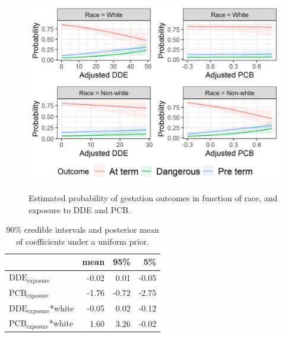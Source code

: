 \documentclass[10pt]{jmlr}%
\begin{document}
\begin{figure}[htbp]
	\centering
	\caption{Estimated probability of gestation outcomes in function of race, and exposure to DDE and PCB.}
	\includegraphics[width=0.7\linewidth]{results}
	\label{fig:results}
\end{figure}



\begin{table}
	\centering
	\begin{tabular}{lrrr}
		\toprule
		& mean & 95\% & 5\%\\
		\midrule
		$\text{DDE}_{\text{exposure}}$ & -0.02 & 0.01 & -0.05\\
		$\text{PCB}_{\text{exposure}}$ & -1.76 & -0.72 & -2.75\\
		$\text{DDE}_{\text{exposure}}$*white & -0.05 & 0.02 & -0.12\\
		$\text{PCB}_{\text{exposure}}$*white & 1.60 & 3.26 & -0.02\\
		\bottomrule
	\end{tabular}
	\caption{ 90\% credible intervals and posterior mean of coefficients under a uniform prior.}
	\label{tab:confintsunif}
\end{table}
\end{document}
